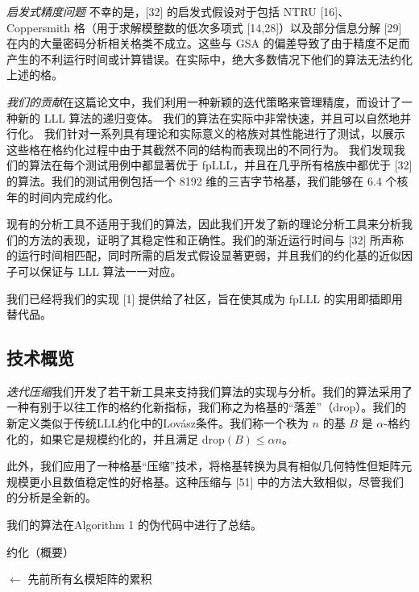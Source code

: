 \documentclass[UTF8]{ctexart}
\begin{document}
{\emph {启发式精度问题}\quad} 不幸的是，[32] 的启发式假设对于包括 NTRU [16]、Coppersmith 格（用于求解模整数的低次多项式 [14,28]）以及部分信息分解 [29] 在内的大量密码分析相关格类不成立。这些与 GSA 的偏差导致了由于精度不足而产生的不利运行时间或计算错误。在实际中，绝大多数情况下他们的算法无法约化上述的格。


\emph{我们的贡献}\quad 在这篇论文中，我们利用一种新颖的迭代策略来管理精度，而设计了一种新的 LLL 算法的递归变体。
我们的算法在实际中非常快速，并且可以自然地并行化。
我们针对一系列具有理论和实际意义的格族对其性能进行了测试，以展示这些格在格约化过程中由于其截然不同的结构而表现出的不同行为。
我们发现我们的算法在每个测试用例中都显著优于 fpLLL，并且在几乎所有格族中都优于 [32] 的算法。我们的测试用例包括一个 8192 维的三吉字节格基，我们能够在 6.4 个核年的时间内完成约化。

现有的分析工具不适用于我们的算法，因此我们开发了新的理论分析工具来分析我们的方法的表现，证明了其稳定性和正确性。我们的渐近运行时间与 [32] 所声称的运行时间相匹配，同时所需的启发式假设显著更弱，并且我们的约化基的近似因子可以保证与 LLL 算法一一对应。

我们已经将我们的实现 [1] 提供给了社区，旨在使其成为 fpLLL 的实用即插即用替代品。

    \subsection{技术概览}

    \emph{迭代压缩}\quad 我们开发了若干新工具来支持我们算法的实现与分析。我们的算法采用了一种有别于以往工作的格约化新指标，我们称之为格基的“落差”（drop）。我们的新定义类似于传统LLL约化中的Lovász条件。我们称一个秩为 \(n\) 的基 \(B\) 是 \(\alpha\)-格约化的，如果它是规模约化的，并且满足 \(\text{drop}(B) \leq \alpha n\)。

    此外，我们应用了一种格基“压缩”技术，将格基转换为具有相似几何特性但矩阵元规模更小且数值稳定性的好格基。这种压缩与 [51] 中的方法大致相似，尽管我们的分析是全新的。

    我们的算法在Algorithm 1 的伪代码中进行了总结。


	\SetAlgoNoEnd
	\begin{algorithm}[h]
	 \caption{约化（概要）}%
	 \label{algorithm1}%
	
		\BlankLine
			 $ \leftarrow $ 先前所有幺模矩阵的累积
	\end{algorithm}
\end{document}
